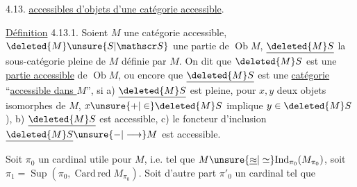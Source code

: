 4.13. \uline{ accessibles d'objets d'une
catégorie accessible}.

\uline{Définition} 4.13.1. Soient $M$ une catégorie
accessible, $\deleted{M}\unsure{S|\mathscr S}$ une partie de $\operatorname{Ob}M$,
$\underline{\deleted{M}S}$ la sous-catégorie pleine de $M$ définie
par $M$. On dit que $\deleted{M}S$ est une
\uline{partie accessible} de $\operatorname{Ob}M$, ou encore
que $\underline{\deleted{M}S}$ est une \uline{catégorie} ``\uline{accessible
dans $M$}'', si a) $\underline{\deleted{M}S}$ est  pleine,
 pour  $x,y$
deux objets isomorphes de $M$, $x\unsure{+|\in}\deleted{M}S$
implique $y\in\deleted{M}S$),  b) $\underline{\deleted{M}S}$ est
accessible, c) le foncteur d'inclusion
$\underline{\deleted{M}S}\unsure{-|\longrightarrow}M$ est accessible.

Soit $\pi_0$ un cardinal utile pour
$M$, i.e. tel que $M\unsure{\underline{\approx}|\simeq}\mathrm{Ind}_{\pi_0}(M_{\pi_0})$,
soit $\pi_1=\operatorname{Sup}(\pi_0,\operatorname{Card\,red} M_{\pi_0})$. Soit
d'autre part $\pi'_0$ un cardinal tel que
